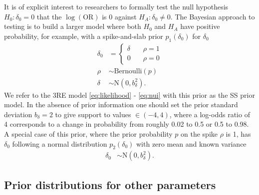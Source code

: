 \documentclass[AMA,STIX1COL]{WileyNJD-v2}
\begin{document}
It is of explicit interest to researchers to formally test the null hypothesis $H_0: \delta_0 = 0$ that the $\log(\mbox{OR})$ is 0 against $H_A: \delta_0 \ne 0$. The Bayesian approach to testing is to build a larger model where both $H_0$ and $H_A$ have positive probability, for example, with a spike-and-slab prior $p_1(\delta_0)$ for $\delta_0$
\begin{align}
\delta_0 & = \left\{
		\begin{array}{ll}
			\delta &\quad \rho = 1 \\
			0 &\quad \rho = 0
		\end{array}
		\right. \label{eq:delta0spike}\\
\rho &\sim \mbox{Bernoulli}(p) \label{eq:spike} \\
\delta &\sim \mbox{N}(0, b_\delta^2). \label{eq:delta}
\end{align}
\noindent We refer to the 3RE model \eqref{eq:likelihood} - \eqref{eq:nui} with this prior as the SS prior model. In the absence of prior information one should set the prior standard deviation $b_\delta = 2$ to give support to values $\in (-4, 4)$, where a log-odds ratio of 4 corresponds to a change in probability from roughly 0.02 to 0.5 or 0.5 to 0.98. A special case of this prior, where the prior probability $p$ on the spike $\rho$ is 1, has $\delta_0$ following a normal distribution $p_2(\delta_0)$ with zero mean and known variance
\begin{align}
\delta_0 &\sim \mbox{N}(0, b_\delta^2). \label{eq:delta0}
\end{align}

\subsection{Prior distributions for other parameters} \label{sec:priors}
\end{document}
